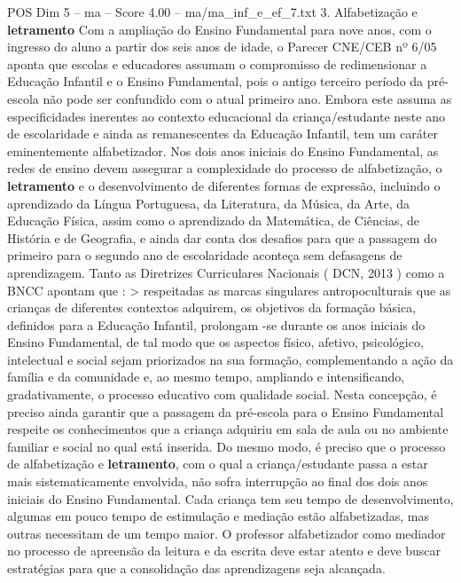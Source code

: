 \begin{textsample}{POS Dim 5 – ma – Score 4.00 – ma/ma\_inf\_e\_ef\_7.txt}  \label{ex:f5_pos_177}
3.
Alfabetização e \textbf{letramento} Com a ampliação do Ensino Fundamental para nove anos, com o ingresso do aluno a partir dos seis anos de idade, o Parecer CNE/CEB nº 6/05 aponta que escolas e educadores assumam o compromisso de redimensionar a Educação Infantil e o Ensino Fundamental, pois o antigo terceiro período da pré-escola não pode ser confundido com o atual primeiro ano.
Embora este assuma as especificidades inerentes ao contexto educacional da criança/estudante neste ano de escolaridade e ainda as remanescentes da Educação Infantil, tem um caráter eminentemente alfabetizador.
Nos dois anos iniciais do Ensino Fundamental, as redes de ensino devem assegurar a complexidade do processo de alfabetização, o \textbf{letramento} e o desenvolvimento de diferentes formas de expressão, incluindo o aprendizado da Língua Portuguesa, da Literatura, da Música, da Arte, da Educação Física, assim como o aprendizado da Matemática, de Ciências, de História e de Geografia, e ainda dar conta dos desafios para que a passagem do primeiro para o segundo ano de escolaridade aconteça sem defasagens de aprendizagem.
Tanto as Diretrizes Curriculares Nacionais ( DCN, 2013 ) como a BNCC apontam que : > respeitadas as marcas singulares antropoculturais que as crianças de diferentes contextos adquirem, os objetivos da formação básica, definidos para a Educação Infantil, prolongam -se durante os anos iniciais do Ensino Fundamental, de tal modo que os aspectos físico, afetivo, psicológico, intelectual e social sejam priorizados na sua formação, complementando a ação da família e da comunidade e, ao mesmo tempo, ampliando e intensificando, gradativamente, o processo educativo com qualidade social.
Nesta concepção, é preciso ainda garantir que a passagem da pré-escola para o Ensino Fundamental respeite os conhecimentos que a criança adquiriu em sala de aula ou no ambiente familiar e social no qual está inserida.
Do mesmo modo, é preciso que o processo de alfabetização e \textbf{letramento}, com o qual a criança/estudante passa a estar mais sistematicamente envolvida, não sofra interrupção ao final dos dois anos iniciais do Ensino Fundamental.
Cada criança tem seu tempo de desenvolvimento, algumas em pouco tempo de estimulação e mediação estão alfabetizadas, mas outras necessitam de um tempo maior.
O professor alfabetizador como mediador no processo de apreensão da leitura e da escrita deve estar atento e deve buscar estratégias para que a consolidação das aprendizagens seja alcançada.

\end{textsample}
